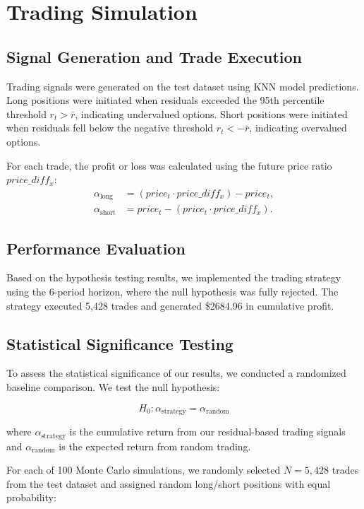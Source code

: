 \documentclass{article}
\begin{document}
\section{Trading Simulation}

\subsection{Signal Generation and Trade Execution}

Trading signals were generated on the test dataset using KNN model predictions. Long positions were initiated when residuals exceeded the 95th percentile threshold $r_t > \bar{r}$, indicating undervalued options. Short positions were initiated when residuals fell below the negative threshold $r_t < -\bar{r}$, indicating overvalued options.

For each trade, the profit or loss was calculated using the future price ratio $price\_diff_x$:
\begin{align*}
\alpha_{\text{long}} &= (price_t \cdot price\_diff_x) - price_t,\\
\alpha_{\text{short}} &= price_t - (price_t \cdot price\_diff_x).
\end{align*}

\subsection{Performance Evaluation}

Based on the hypothesis testing results, we implemented the trading strategy using the 6-period horizon, where the null hypothesis was fully rejected. The strategy executed 5,428 trades and generated \$2684.96 in cumulative profit.

\subsection{Statistical Significance Testing}

To assess the statistical significance of our results, we conducted a randomized baseline comparison. We test the null hypothesis:

\[
H_0: \alpha_{\text{strategy}} = \alpha_{\text{random}}
\]

where $\alpha_{\text{strategy}}$ is the cumulative return from our residual-based trading signals and $\alpha_{\text{random}}$ is the expected return from random trading.

For each of 100 Monte Carlo simulations, we randomly selected $N = 5,428$ trades from the test dataset and assigned random long/short positions with equal probability:
\end{document}
